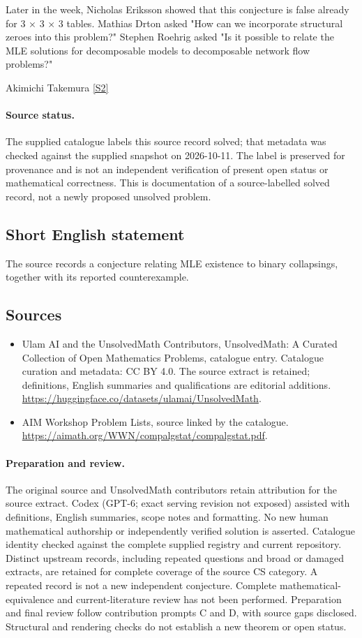 \documentclass[11pt]{article}
\newcommand{\sref}[2]{\hyperlink{source:#1:#2}{[S#2]}}
\begin{document}
Later in the week, Nicholas Eriksson showed that this conjecture is false already for 3 × 3 × 3 tables. Mathias Drton asked "How can we incorporate structural zeroes into this problem?" Stephen Roehrig asked "Is it possible to relate the MLE solutions for decomposable models to decomposable network flow problems?"

Akimichi Takemura \sref{statement}{2}
\paragraph{Source status.}
The supplied catalogue labels this source record solved; that metadata was checked against the supplied snapshot on 2026-10-11. The label is preserved for provenance and is not an independent verification of present open status or mathematical correctness. This is documentation of a source-labelled solved record, not a newly proposed unsolved problem.
\subsection{Short English statement}
The source records a conjecture relating MLE existence to binary collapsings, together with its reported counterexample.
\subsection{Sources}
\begin{itemize}
\item[\hypertarget{source:statement:1}{S1}] Ulam AI and the UnsolvedMath Contributors, UnsolvedMath: A Curated Collection of Open Mathematics Problems, catalogue entry. Catalogue curation and metadata: CC BY 4.0. The source extract is retained; definitions, English summaries and qualifications are editorial additions.
\url{https://huggingface.co/datasets/ulamai/UnsolvedMath}.
\item[\hypertarget{source:statement:2}{S2}] AIM Workshop Problem Lists, source linked by the catalogue.
\url{https://aimath.org/WWN/compalgstat/compalgstat.pdf}.
\end{itemize}
\paragraph{Preparation and review.}
The original source and UnsolvedMath contributors retain attribution for the source extract. Codex (GPT-6; exact serving revision not exposed) assisted with definitions, English summaries, scope notes and formatting. No new human mathematical authorship or independently verified solution is asserted. Catalogue identity checked against the complete supplied registry and current repository. Distinct upstream records, including repeated questions and broad or damaged extracts, are retained for complete coverage of the source CS category. A repeated record is not a new independent conjecture. Complete mathematical-equivalence and current-literature review has not been performed. Preparation and final review follow contribution prompts C and D, with source gaps disclosed. Structural and rendering checks do not establish a new theorem or open status.
\label{end:statement}
\end{document}

